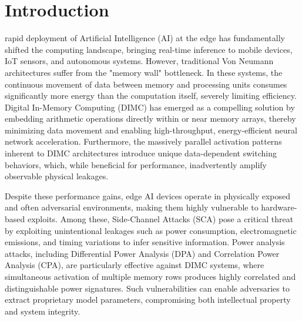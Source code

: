 \documentclass[journal]{IEEEtran}
\begin{document}
\section{Introduction}
% 
% 
% 
% 
 rapid deployment of Artificial Intelligence (AI) at the edge has fundamentally shifted the computing landscape, bringing real-time inference to mobile devices, IoT sensors, and autonomous systems. However, traditional Von Neumann architectures suffer from the "memory wall" bottleneck. In these systems, the continuous movement of data between memory and processing units consumes significantly more energy than the computation itself, severely limiting efficiency. Digital In-Memory Computing (DIMC) has emerged as a compelling solution by embedding arithmetic operations directly within or near memory arrays, thereby minimizing data movement and enabling high-throughput, energy-efficient neural network acceleration. Furthermore, the massively parallel activation patterns inherent to DIMC architectures introduce unique data-dependent switching behaviors, which, while beneficial for performance, inadvertently amplify observable physical leakages.

Despite these performance gains, edge AI devices operate in physically exposed and often adversarial environments, making them highly vulnerable to hardware-based exploits. Among these, Side-Channel Attacks (SCA) pose a critical threat by exploiting unintentional leakages such as power consumption, electromagnetic emissions, and timing variations to infer sensitive information. Power analysis attacks, including Differential Power Analysis (DPA) and Correlation Power Analysis (CPA), are particularly effective against DIMC systems, where simultaneous activation of multiple memory rows produces highly correlated and distinguishable power signatures. Such vulnerabilities can enable adversaries to extract proprietary model parameters, compromising both intellectual property and system integrity.
\end{document}
